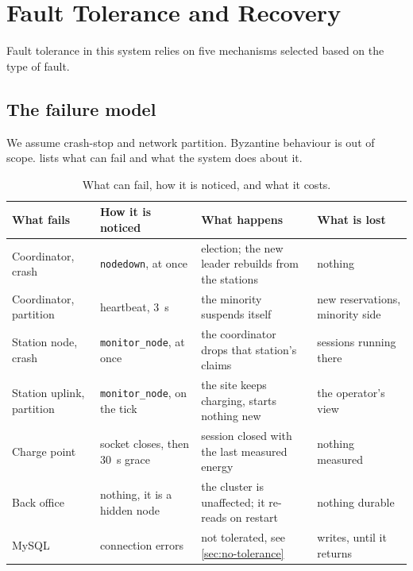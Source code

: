 \section{Fault Tolerance and Recovery}
\label{sec:fault-tolerance}

Fault tolerance in this system relies on five mechanisms selected based on the type of fault.

\subsection{The failure model}
\label{sec:failure-model}

We assume crash-stop and network partition. Byzantine behaviour is out of scope.  lists what can fail
and what the system does about it.

\begin{table}[t]
\centering\small
\renewcommand{\arraystretch}{1.2}
\caption{What can fail, how it is noticed, and what it costs.}
\label{tab:failures}
\begin{tabularx}{\textwidth}{@{}>{\raggedright\arraybackslash}p{2.6cm}
                               >{\raggedright\arraybackslash}p{2.9cm}
                               X
                               >{\raggedright\arraybackslash}p{2.9cm}@{}}
\toprule
What fails & How it is noticed & What happens & What is lost \\
\midrule
Coordinator, crash & \texttt{nodedown}, at once &
  election; the new leader rebuilds from the stations &
  nothing \\
Coordinator, partition & heartbeat, 3~s &
  the minority suspends itself &
  new reservations, minority side \\
Station node, crash & \texttt{monitor\_node}, at once &
  the coordinator drops that station's claims &
  sessions running there \\
Station uplink, partition & \texttt{monitor\_node}, on the tick &
  the site keeps charging, starts nothing new &
  the operator's view \\
Charge point & socket closes, then 30~s grace &
  session closed with the last measured energy &
  nothing measured \\
Back office & nothing, it is a hidden node &
  the cluster is unaffected; it re-reads on restart &
  nothing durable \\
MySQL & connection errors &
  not tolerated, see \cref{sec:no-tolerance} &
  writes, until it returns \\
\bottomrule
\end{tabularx}
\end{table}

